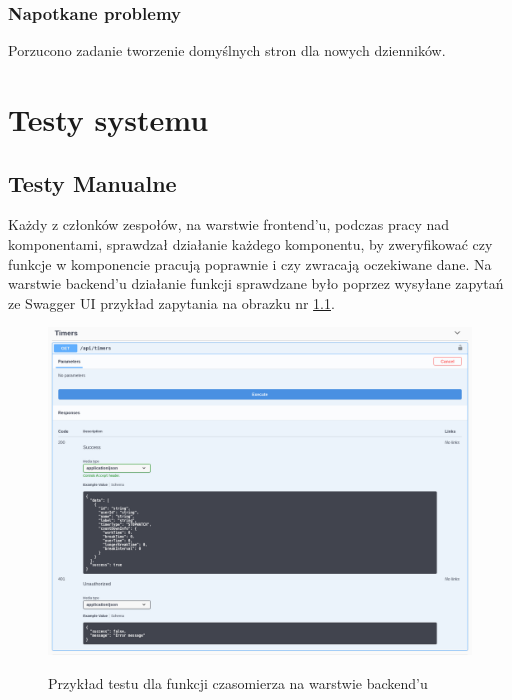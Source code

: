 \documentclass[a4paper,11pt]{report}
\begin{document}
\subsection {Napotkane problemy}
Porzucono zadanie tworzenie domyślnych stron dla nowych dzienników.\\

\chapter {Testy systemu}
\section{Testy Manualne}

Każdy z członków zespołów, na warstwie frontend'u, podczas pracy nad komponentami, sprawdzał działanie każdego komponentu,
 by zweryfikować czy funkcje w komponencie pracują poprawnie i czy zwracają oczekiwane dane.
Na warstwie backend'u działanie funkcji sprawdzane było poprzez wysyłane zapytań ze Swagger UI przykład zapytania na obrazku nr \ref{fig:timer_postman}.
\begin{figure}[H]
	\centering
	\includegraphics[scale=0.35]{testy/timer_postman}\\
	\caption{Przykład testu dla funkcji czasomierza na warstwie backend'u}
	\label{fig:timer_postman}
\end{figure}
\end{document}
